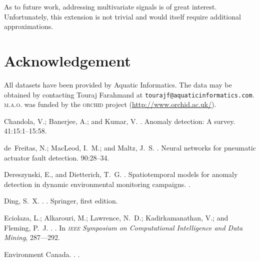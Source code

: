 \documentclass[letterpaper]{article}
\newcommand{\acro}[1]{\textsc{\MakeLowercase{#1}}}
\begin{document}
As to future work, addressing multivariate signals is of great interest. Unfortunately, this extension is not trivial and would itself require additional approximations. 

\section*{Acknowledgement}
All datasets have been provided by Aquatic Informatics. The data may
be obtained by contacting Touraj Farahmand at
\texttt{tourajf@aquaticinformatics.com}. \acro{m.a.o.} was funded by the \acro{orchid} project (\url{http://www.orchid.ac.uk/}).

% 
% 
% 
\begin{thebibliography}{}

Chandola, V.; Banerjee, A.; and Kumar, V.
.
\newblock Anomaly detection: A survey.
 41:15:1--15:58.

de~Freitas, N.; MacLeod, I.~M.; and Maltz, J.~S.
.
\newblock Neural networks for pneumatic actuator fault detection.
 90:28--34.

Dereszynski, E., and Dietterich, T.~G.
.
\newblock Spatiotemporal models for anomaly detection in dynamic environmental
  monitoring campaigns.
.

Ding, S.~X.
.
.
\newblock Springer, first edition.

Eciolaza, L.; Alkarouri, M.; Lawrence, N.~D.; Kadirkamanathan, V.; and Fleming,
  P.~J.
.
.
\newblock In {\em \acro{ieee} Symposium on Computational Intelligence and Data
  Mining},  287---292.

{Environment Canada}.
.
.


\end{thebibliography}
\end{document}
